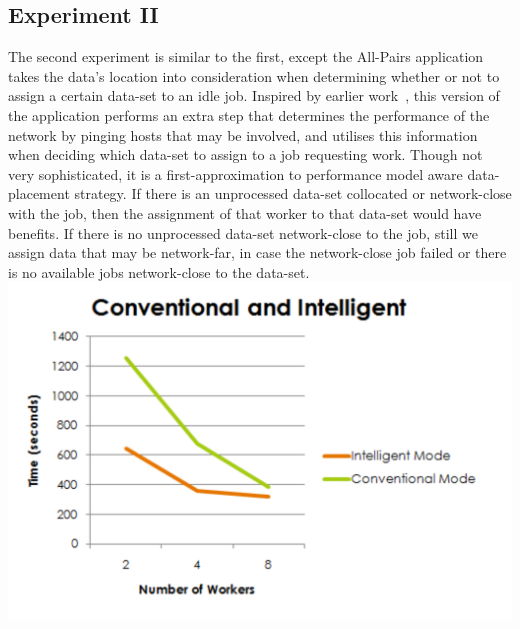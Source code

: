 \documentclass{rspublic}
\begin{document}
\subsection{Experiment II} The second experiment is similar to the
first, except the All-Pairs application takes the data's location into
consideration when determining whether or not to assign a certain
data-set to an idle job. Inspired by earlier work~\citep{netperf}, this
version of the application performs an extra step that determines the
performance of the network by pinging hosts that may be involved, and
utilises this information when deciding which data-set to assign to a
job requesting work. Though not very sophisticated, it is a
first-approximation to performance model aware data-placement strategy.
If there is an unprocessed data-set collocated or network-close with the
job, then the assignment of that worker to that data-set would have
benefits. If there is no unprocessed data-set network-close to the job,
still we assign data that may be network-far, in case the network-close
job failed or there is no available jobs network-close to the data-set.
\includegraphics[width=\textwidth]{ConventionalIntelligent.pdf}
\end{document}

